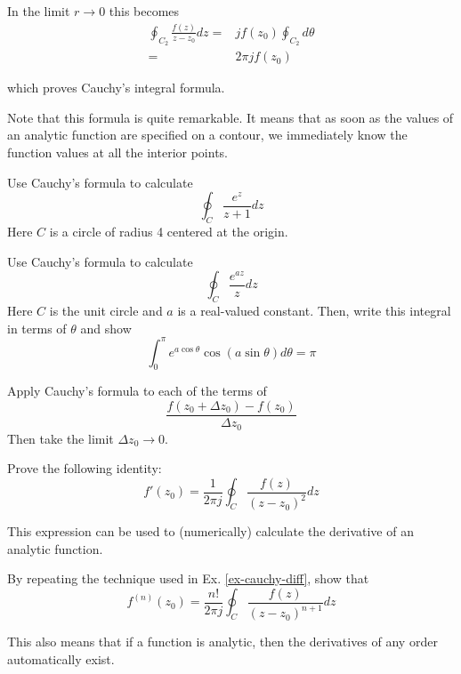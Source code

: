 In the limit $ r \to 0 $ this becomes
\begin{align}
\oint_{{C}_2} \frac{f(z)} {z-z_0} dz = & j f(z_0) \oint_{{C}_2}
d \theta \nonumber \\
 = &2 \pi j f(z_0)
\end{align}
 
which proves Cauchy's integral formula.

Note that this formula is quite remarkable. It means that as soon as the values of an analytic function are specified on a contour, we immediately know the function values at all the interior points.

\begin{exer}
Use Cauchy's formula to calculate 
$$\oint_{{C}}  \frac {e^z} {z+1} dz$$
Here ${C}$ is a circle of radius 4 centered at the origin. 
\end{exer}

\begin{exer}
Use Cauchy's formula to calculate 
$$\oint_{{C}}  \frac {e^{az}} {z} dz$$
Here ${C}$ is the unit circle and $a$ is a real-valued constant. Then, write this integral in terms of $\theta$ and show
$$ \int_0^\pi e ^{a \cos \theta} \cos (a \sin \theta) d\theta = \pi $$ 
\end{exer}


\begin{exer}
\begin{hnt}
  Apply Cauchy's formula to each of the terms of
  $$\frac{f(z_0+\Delta z_0) - f(z_0)}{\Delta z_0}$$
  Then take the limit ${\Delta z_0} \to 0$.
\end{hnt}
Prove the following identity:
$$f'(z_0)=\frac{1}{2 \pi j} \oint_{{C}} \frac{f(z)} {(z-z_0)^2} dz$$

This expression can be used to (numerically) calculate the derivative of an analytic function.
\label{ex-cauchy-diff}
\end{exer}

\begin{exer}
By repeating the technique used in Ex. \ref{ex-cauchy-diff}, show that $$f^{(n)}(z_0)=\frac{n!}{2 \pi j} \oint_{{C}} \frac{f(z)} {(z-z_0)^{n+1}} dz$$

This also means that if a function is analytic, then the derivatives of any order automatically exist.
\end{exer}



